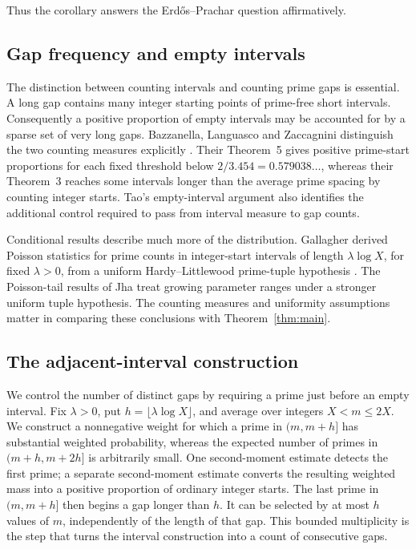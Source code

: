 Thus the corollary answers the Erd\H{o}s--Prachar question affirmatively.

\subsection*{Gap frequency and empty intervals}

The distinction between counting intervals and counting prime gaps is
essential. A long gap contains many integer starting points of
prime-free short intervals. Consequently a positive proportion of
empty intervals may be accounted for by a sparse set of very long
gaps. Bazzanella, Languasco and Zaccagnini distinguish the two counting
measures explicitly \cite{BLZ2010}. Their Theorem~5 gives positive
prime-start proportions for each fixed threshold below
$2/3.454=0.579038\ldots$, whereas their Theorem~3 reaches some
intervals longer than the average prime spacing by counting integer
starts. Tao's empty-interval argument \cite{Tao2019} also identifies
the additional control required to pass from interval measure to
gap counts.

Conditional results describe much more of the distribution.
Gallagher derived Poisson statistics for prime counts in
integer-start intervals of length $\lambda\log X$, for fixed
$\lambda>0$, from a uniform
Hardy--Littlewood prime-tuple hypothesis
\cite[Theorem~1]{Gallagher1976}.
The Poisson-tail results of Jha
\cite[Theorems~1.4 and~1.6]{Jha2026} treat growing parameter ranges
under a stronger uniform tuple hypothesis.
The counting measures and uniformity assumptions matter in comparing
these conclusions with Theorem~\ref{thm:main}.

\subsection*{The adjacent-interval construction}

We control the number of distinct gaps by requiring a prime just
before an empty interval. Fix $\lambda>0$, put
$h=\lfloor\lambda\log X\rfloor$, and average over integers
$X<m\le2X$. We construct a nonnegative weight for which a prime in
$(m,m+h]$ has substantial weighted probability, whereas the expected
number of primes in $(m+h,m+2h]$ is arbitrarily small.
One second-moment estimate detects the first prime; a separate
second-moment estimate converts the resulting weighted mass into a
positive proportion of ordinary integer starts.
The last prime in $(m,m+h]$ then begins a gap longer than $h$.
It can be selected by at most $h$ values of $m$, independently of
the length of that gap. This bounded multiplicity is the step that
turns the interval construction into a count of consecutive gaps.

